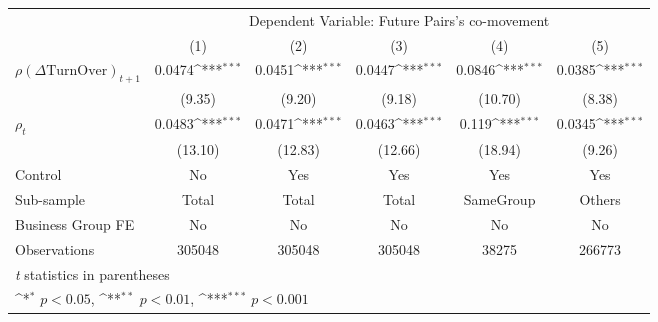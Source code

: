 {
\def\sym#1{\ifmmode^{#1}\else\(^{#1}\)\fi}
\begin{tabular}{l*{5}{c}}
\hline\hline
                &\multicolumn{5}{c}{Dependent Variable:  Future Pairs's co-movement}                           \\\cmidrule(lr){2-6}
                &\multicolumn{1}{c}{(1)}         &\multicolumn{1}{c}{(2)}         &\multicolumn{1}{c}{(3)}         &\multicolumn{1}{c}{(4)}         &\multicolumn{1}{c}{(5)}         \\
\hline
 $ {\rho(\Delta \text{TurnOver})_{t+1}} $ &   0.0474\sym{***}&   0.0451\sym{***}&   0.0447\sym{***}&   0.0846\sym{***}&   0.0385\sym{***}\\
                &   (9.35)         &   (9.20)         &   (9.18)         &  (10.70)         &   (8.38)         \\
[1em]
 $ {\rho_t} $   &   0.0483\sym{***}&   0.0471\sym{***}&   0.0463\sym{***}&    0.119\sym{***}&   0.0345\sym{***}\\
                &  (13.10)         &  (12.83)         &  (12.66)         &  (18.94)         &   (9.26)         \\
\hline
Control         &       No         &      Yes         &      Yes         &      Yes         &      Yes         \\
Sub-sample      &    Total         &    Total         &    Total         &SameGroup         &   Others         \\
Business Group FE&       No         &       No         &       No         &       No         &       No         \\
Observations    &   305048         &   305048         &   305048         &    38275         &   266773         \\
\hline\hline
\multicolumn{6}{l}{\footnotesize \textit{t} statistics in parentheses}\\
\multicolumn{6}{l}{\footnotesize \sym{*} \(p<0.05\), \sym{**} \(p<0.01\), \sym{***} \(p<0.001\)}\\
\end{tabular}
}
